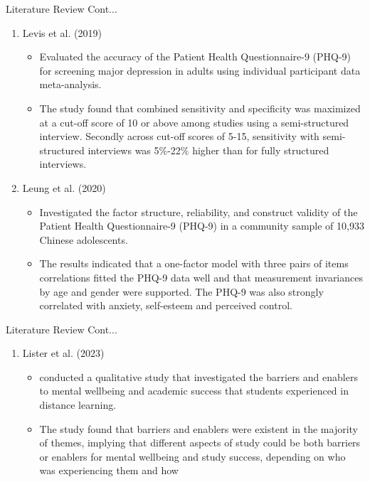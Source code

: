 \documentclass{beamer}
\newcounter{saveenumi}
\newcommand{\seti}{\setcounter{saveenumi}{\value{enumi}}}
\newcommand{\conti}{\setcounter{enumi}{\value{saveenumi}}}
\numberwithin{equation}{section}
\numberwithin{table}{section}
\begin{document}
\begin{frame}{Literature Review Cont...}
	\begin{enumerate}
		\conti
		\item Levis et al. (2019)
		\begin{itemize}
			\item Evaluated the accuracy of the Patient Health Questionnaire-9 (PHQ-9) for screening major depression in adults using individual participant data meta-analysis.
			\item The study found that combined sensitivity and specificity was maximized at a cut-off score of 10 or above among studies using a semi-structured interview. Secondly across cut-off scores of 5-15, sensitivity with semi-structured interviews was 5\%-22\% higher than for fully structured interviews.
		\end{itemize}
	\item Leung et al. (2020)
	\begin{itemize}
		\item Investigated the factor structure, reliability, and construct validity of the Patient Health Questionnaire-9 (PHQ-9) in a community sample of 10,933 Chinese adolescents.
		\item The results indicated that a one-factor model with three pairs of items correlations fitted the PHQ-9 data well and that measurement invariances by age and gender were supported. The PHQ-9 was also strongly correlated with anxiety, self-esteem and perceived control.
	\end{itemize}
	\seti
	\end{enumerate}
\end{frame}
\begin{frame}{Literature Review Cont...}
	\begin{enumerate}
		\conti
		\item Lister et al. (2023)
		\begin{itemize}
			\item conducted a qualitative study that investigated the barriers and enablers to mental wellbeing and academic success that students experienced in distance learning.
			\item The study found that barriers and enablers were existent in the majority of themes, implying that different aspects of study could be both barriers or enablers for mental wellbeing and study success, depending on who was experiencing them and how
		\end{itemize}
	\end{enumerate}
\end{frame}
\end{document}
